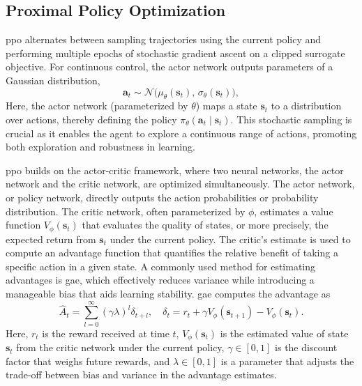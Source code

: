 \subsection{Proximal Policy Optimization}
\gls{ppo} \cite{schulman2017proximal} alternates between sampling trajectories using the current policy and performing multiple epochs of stochastic gradient ascent on a clipped surrogate objective. For continuous control, the actor network outputs parameters of a Gaussian distribution,
\begin{equation}
\mathbf{a}_t \sim \mathcal{N}\bigl(\mu_\theta(\mathbf{s}_t),\,\sigma_\theta(\mathbf{s}_t)\bigr),
\end{equation}
Here, the actor network (parameterized by \(\theta\)) maps a state \(\mathbf{s}_t\) to a distribution over actions, thereby defining the policy \(\pi_\theta(\mathbf{a}_t \mid \mathbf{s}_t)\). This stochastic sampling is crucial as it enables the agent to explore a continuous range of actions, promoting both exploration and robustness in learning.

\gls{ppo} builds on the actor-critic framework, where two neural networks, the actor network and the critic network, are optimized simultaneously. The actor network, or policy network, directly outputs the action probabilities or probability distribution. The critic network, often parameterized by \(\phi\), estimates a value function \(V_\phi(\mathbf{s}_t)\) that evaluates the quality of states, or more precisely, the expected return from \(\mathbf{s}_t\) under the current policy. The critic's estimate is used to compute an advantage function that quantifies the relative benefit of taking a specific action in a given state. A commonly used method for estimating advantages is \gls{gae}, which effectively reduces variance while introducing a manageable bias that aids learning stability. \gls{gae} computes the advantage as
\begin{equation}
\hat{A}_t = \sum_{l=0}^{\infty} (\gamma \lambda)^l \delta_{t+l}, 
\quad
\delta_t = r_t + \gamma V_\phi(\mathbf{s}_{t+1}) - V_\phi(\mathbf{s}_t).
\end{equation}
Here, \(r_t\) is the reward received at time \(t\), \(V_\phi(\mathbf{s}_t)\) is the estimated value of state \(\mathbf{s}_t\) from the critic network under the current policy, \(\gamma \in [0,1]\) is the discount factor that weighs future rewards, and \(\lambda \in [0,1]\) is a parameter that adjusts the trade-off between bias and variance in the advantage estimates.

